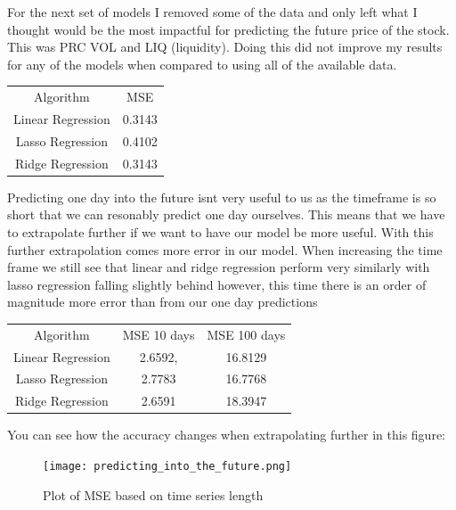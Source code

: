\documentclass{report}
\begin{document}
For the next set of models I removed some of the data and only left what I thought would be the most impactful for predicting the future price of the stock.
This was PRC VOL and LIQ (liquidity).
Doing this did not improve my results for any of the models when compared to using all of the available data.

\begin{minipage} {\linewidth}
\bigskip
\centering
{}
\begin{tabular}{c c}
    Algorithm & MSE \\
    Linear Regression & 0.3143 \\
    Lasso Regression & 0.4102 \\
    Ridge Regression & 0.3143
\end{tabular}
\bigskip
\end{minipage}

Predicting one day into the future isnt very useful to us as the timeframe is so short that we can resonably predict one day ourselves. This means that we have to extrapolate further if we want to have our model be more useful.
With this further extrapolation comes more error in our model.
When increasing the time frame we still see that linear and ridge regression perform very similarly with lasso regression falling slightly behind however, this time there is an order of magnitude more error than from our one day predictions

\begin{minipage} {\linewidth}
\bigskip
\centering
{}
\begin{tabular}{c c c}
    Algorithm & MSE 10 days & MSE 100 days \\
    Linear Regression & 2.6592, & 16.8129 \\
    Lasso Regression & 2.7783 & 16.7768 \\
    Ridge Regression & 2.6591 & 18.3947
\end{tabular}
\bigskip
\end{minipage}

You can see how the accuracy changes when extrapolating further in this figure:

\begin{figure}
    \caption{Plot of MSE based on time series length}
    \centering
    \texttt{[image: predicting\_into\_the\_future.png]}
\end{figure}
\end{document}
